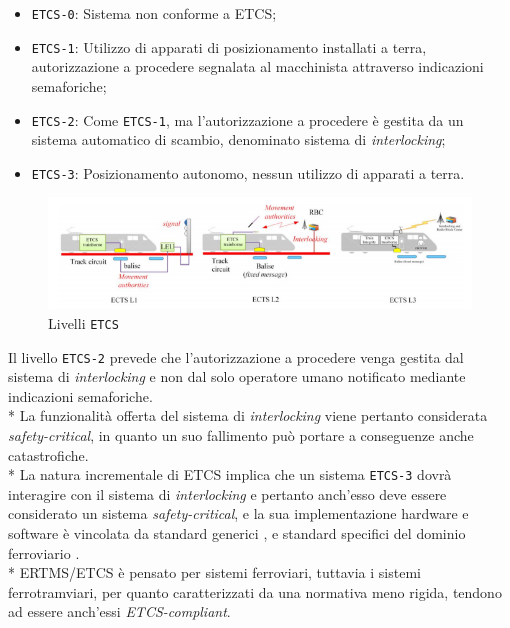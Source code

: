 \begin{itemize}
	\item \texttt{ETCS-0}: Sistema non conforme a ETCS;
	\item \texttt{ETCS-1}: Utilizzo di apparati di posizionamento installati a terra, autorizzazione a procedere segnalata al macchinista attraverso indicazioni semaforiche;
	\item \texttt{ETCS-2}: Come \texttt{ETCS-1}, ma l'autorizzazione a procedere \`e gestita da un sistema automatico di scambio, denominato sistema di \emph{interlocking};\cite{interlocking}
	\item \texttt{ETCS-3}: Posizionamento autonomo, nessun utilizzo di apparati a terra.
\end{itemize}
\begin{figure}[h]
	\centering
	\includegraphics[width=\linewidth]{img/etcs123.png}
	\caption{Livelli \texttt{ETCS}}
	\label{fig:etcs123}
\end{figure}
Il livello \texttt{ETCS-2} prevede che l'autorizzazione a procedere venga gestita dal sistema di \emph{interlocking} e non dal solo operatore umano notificato mediante indicazioni semaforiche.\\*
La funzionalit\`a offerta del sistema di \emph{interlocking} viene pertanto considerata \emph{safety-critical}, in quanto un suo fallimento pu\`o portare a conseguenze anche catastrofiche.\cite{marocchini}\\*
La natura incrementale di ETCS implica che un sistema \texttt{ETCS-3} dovr\`a interagire con il sistema di \emph{interlocking} e pertanto anch'esso deve essere considerato un sistema \emph{safety-critical}, e la sua implementazione hardware e software \`e vincolata da standard generici \cite{MISRA} \cite{sil}, e standard specifici del dominio ferroviario \cite{50128}.\\*
ERTMS/ETCS \`e pensato per sistemi ferroviari, tuttavia i sistemi ferrotramviari, per quanto caratterizzati da una normativa meno rigida, tendono ad essere anch'essi \emph{ETCS-compliant}.

